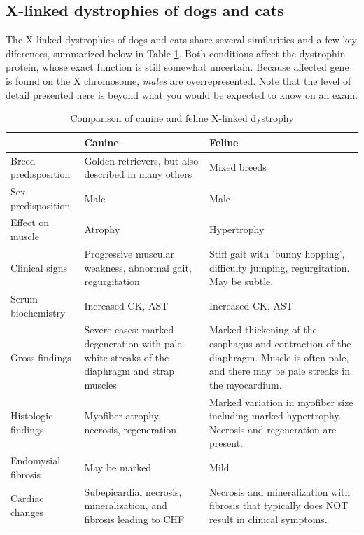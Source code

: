 \documentclass[openany]{book}
\begin{document}
\subsection{X-linked dystrophies of dogs and
cats}\label{x-linked-dystrophies-of-dogs-and-cats}

The X-linked dystrophies of dogs and cats share several similarities and
a few key diferences, summarized below in Table
\ref{tab:dystrophy-table}. Both conditions affect the dystrophin
protein, whose exact function is still somewhat uncertain. Because
affected gene is found on the X chromosome, \emph{males} are
overrepresented. Note that the level of detail presented here is beyond
what you would be expected to know on an exam.

\begin{table}[t]

\caption{\label{tab:dystrophy-table}Comparison of canine and feline X-linked dystrophy}
\centering
\begin{tabular}{l>{\raggedright\arraybackslash}p{15em}>{\raggedright\arraybackslash}p{15em}}
\toprule
  & Canine & Feline\\
\midrule
Breed predisposition & Golden retrievers, but also described in many others & Mixed breeds\\
Sex predisposition & Male & Male\\
Effect on muscle & Atrophy & Hypertrophy\\
Clinical signs & Progressive muscular weakness, abnormal gait, regurgitation & Stiff gait with 'bunny hopping', difficulty jumping, regurgitation. May be subtle.\\
Serum biochemistry & Increased CK, AST & Increased CK, AST\\
\addlinespace
Gross findings & Severe cases: marked degeneration with pale white streaks of the diaphragm and strap muscles & Marked thickening of the esophagus and contraction of the diaphragm. Muscle is often pale, and there may be pale streaks in the myocardium.\\
Histologic findings & Myofiber atrophy, necrosis, regeneration & Marked variation in myofiber size including marked hypertrophy. Necrosis and regeneration are present.\\
Endomysial fibrosis & May be marked & Mild\\
Cardiac changes & Subepicardial necrosis, mineralization, and fibrosis leading to CHF & Necrosis and mineralization with fibrosis that typically does NOT result in clinical symptoms.\\
\bottomrule
\end{tabular}
\end{table}
\end{document}
